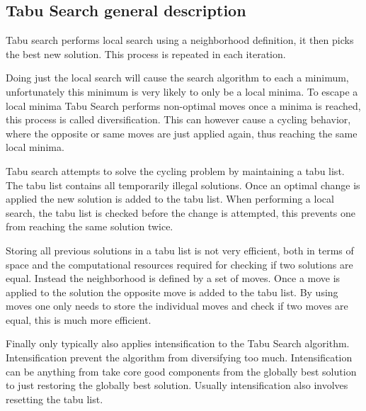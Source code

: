\subsection{Tabu Search general description}

Tabu search performs local search using a neighborhood definition, it then picks the best new solution. This process is repeated in each iteration.

Doing just the local search will cause the search algorithm to each a minimum, unfortunately this minimum is very likely to only be a local minima. To escape a local minima Tabu Search performs non-optimal moves once a minima is reached, this process is called diversification. This can however cause a cycling behavior, where the opposite or same moves are just applied again, thus reaching the same local minima.

Tabu search attempts to solve the cycling problem by maintaining a tabu list. The tabu list contains all temporarily illegal solutions. Once an optimal change is applied the new solution is added to the tabu list. When performing a local search, the tabu list is checked before the change is attempted, this prevents one from reaching the same solution twice.

Storing all previous solutions in a tabu list is not very efficient, both in terms of space and the computational resources required for checking if two solutions are equal. Instead the neighborhood is defined by a set of moves. Once a move is applied to the solution the opposite move is added to the tabu list. By using moves one only needs to store the individual moves and check if two moves are equal, this is much more efficient.

Finally only typically also applies intensification to the Tabu Search algorithm. Intensification prevent the algorithm from diversifying too much. Intensification can be anything from take core good components from the globally best solution to just restoring the globally best solution. Usually intensification also involves resetting the tabu list.

